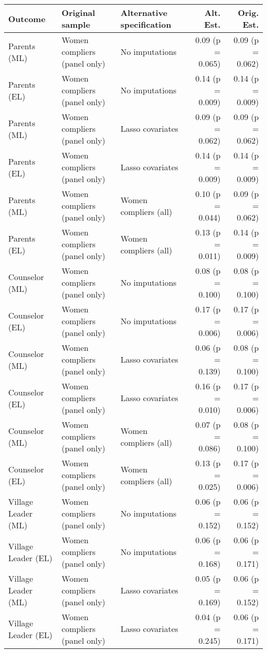 \begin{tabular}{lllrr}
  \hline
Outcome & Original sample & Alternative specification & Alt. Est. & Orig. Est. \\ 
  \hline
 Parents (ML) & Women compliers (panel only) & No imputations & 0.09 (p = 0.065) & 0.09 (p = 0.062) \\ 
   Parents (EL) & Women compliers (panel only) & No imputations & 0.14 (p = 0.009) & 0.14 (p = 0.009) \\ 
   Parents (ML) & Women compliers (panel only) & Lasso covariates & 0.09 (p = 0.062) & 0.09 (p = 0.062) \\ 
   Parents (EL) & Women compliers (panel only) & Lasso covariates & 0.14 (p = 0.009) & 0.14 (p = 0.009) \\ 
   Parents (ML) & Women compliers (panel only) & Women compliers (all) & 0.10 (p = 0.044) & 0.09 (p = 0.062) \\ 
   Parents (EL) & Women compliers (panel only) & Women compliers (all) & 0.13 (p = 0.011) & 0.14 (p = 0.009) \\ 
   Counselor (ML) & Women compliers (panel only) & No imputations & 0.08 (p = 0.100) & 0.08 (p = 0.100) \\ 
   Counselor (EL) & Women compliers (panel only) & No imputations & 0.17 (p = 0.006) & 0.17 (p = 0.006) \\ 
   Counselor (ML) & Women compliers (panel only) & Lasso covariates & 0.06 (p = 0.139) & 0.08 (p = 0.100) \\ 
   Counselor (EL) & Women compliers (panel only) & Lasso covariates & 0.16 (p = 0.010) & 0.17 (p = 0.006) \\ 
   Counselor (ML) & Women compliers (panel only) & Women compliers (all) & 0.07 (p = 0.086) & 0.08 (p = 0.100) \\ 
   Counselor (EL) & Women compliers (panel only) & Women compliers (all) & 0.13 (p = 0.025) & 0.17 (p = 0.006) \\ 
   Village Leader (ML) & Women compliers (panel only) & No imputations & 0.06 (p = 0.152) & 0.06 (p = 0.152) \\ 
   Village Leader (EL) & Women compliers (panel only) & No imputations & 0.06 (p = 0.168) & 0.06 (p = 0.171) \\ 
   Village Leader (ML) & Women compliers (panel only) & Lasso covariates & 0.05 (p = 0.169) & 0.06 (p = 0.152) \\ 
   Village Leader (EL) & Women compliers (panel only) & Lasso covariates & 0.04 (p = 0.245) & 0.06 (p = 0.171) \\ 

\end{tabular}
